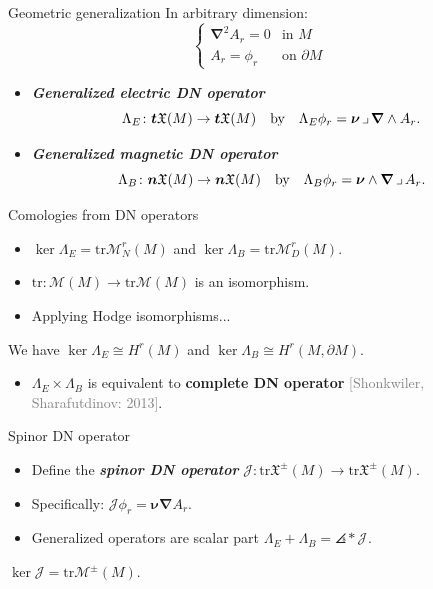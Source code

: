 \documentclass[aspectratio=169]{beamer}
\newcommand\boldgreen[1]{\textcolor{lighter_csu_green}{\emph{\textbf{#1}}}}
\newcommand\boldgold[1]{\textcolor{csu_gold}{\textbf{#1}}}
\newcommand\grey[1]{\textcolor{gray}{#1}}
\newcommand{\trace}{\mathrm{tr}}
\newcommand{\tangentpart}{\boldsymbol{t}}
\newcommand{\normalpart}{\boldsymbol{n}}
\newcommand{\grad}{\boldsymbol{\nabla}}
\newcommand{\monogenics}{\mathcal{M}}
\newcommand{\blade}[1]{\boldsymbol{#1}}
\newcommand{\boundary}{{\partial M}}
\newcommand{\normal}{\blade{\nu}}
\newcommand{\contract}{\hspace*{.5mm} \lrcorner \hspace*{.5mm}}
\DeclarePairedDelimiter\angles{\langle}{\rangle}
\newcommand{\proj}[2]{\angles*{#2}_{#1}}
\newcommand{\smoothfields}{\mathfrak{X}}
\begin{document}
\begin{frame}{Geometric generalization}
\vfill
\pause
In arbitrary dimension:
\[
\begin{cases}
\grad^2 A_r = 0 & \textrm{in $M$}\\
A_r = \phi_r & \textrm{on $\partial M$}
\end{cases}
\]
\begin{itemize}
\pause
\item \boldgreen{Generalized electric DN operator}
\[
\Lambda_E \colon \tangentpart \smoothfields(M) \to \tangentpart \smoothfields(M) \quad \textrm{by} \quad \Lambda_E \phi_r = \normal \contract \grad \wedge A_r.
\]
\pause
\item \boldgreen{Generalized magnetic DN operator}
\[
\Lambda_B \colon \normalpart \smoothfields(M) \to \normalpart \smoothfields(M) \quad \textrm{by} \quad \Lambda_B \phi_r = \normal \wedge \grad \contract A_r.
\]
\end{itemize}
\vfill
\end{frame}


\begin{frame}{Comologies from DN operators}
\vfill
\begin{itemize}
\pause
\item $\ker \Lambda_{E} = \trace \monogenics_N^r(M)$ and $\ker \Lambda_B =\trace \monogenics_D^r(M)$.
\pause
\item $\trace \colon \monogenics(M) \to \trace \monogenics(M)$ is an isomorphism.
\pause
\item Applying Hodge isomorphisms...
\end{itemize}
\begin{thm*}{}{}
We have $\ker \Lambda_E \cong H^r(M)$ and $\ker \Lambda_B \cong H^r(M,\boundary)$.
\end{thm*}
\pause
\begin{itemize}
  \item $\Lambda_E \times \Lambda_B$ is equivalent to \boldgold{complete DN operator} \grey{[Shonkwiler, Sharafutdinov: 2013]}.
\end{itemize}
\vfill
\end{frame}

\begin{frame}{Spinor DN operator}
\vfill
\begin{itemize}
\pause
\item Define the \boldgreen{spinor DN operator} $\mathcal{J}\colon \trace \smoothfields^\pm(M) \to \trace \smoothfields^\pm(M)$.
\pause
\item Specifically: $\mathcal{J}\phi_r = \normal \grad A_r$.
\pause
\item Generalized operators are scalar part $\Lambda_E+\Lambda_B = \proj{}{\mathcal{J}}$.
\end{itemize}
\pause
\begin{thm*}{}{}
$\ker \mathcal{J} = \trace \monogenics^\pm(M)$.
\end{thm*}
\vfill
\end{frame}
\end{document}
